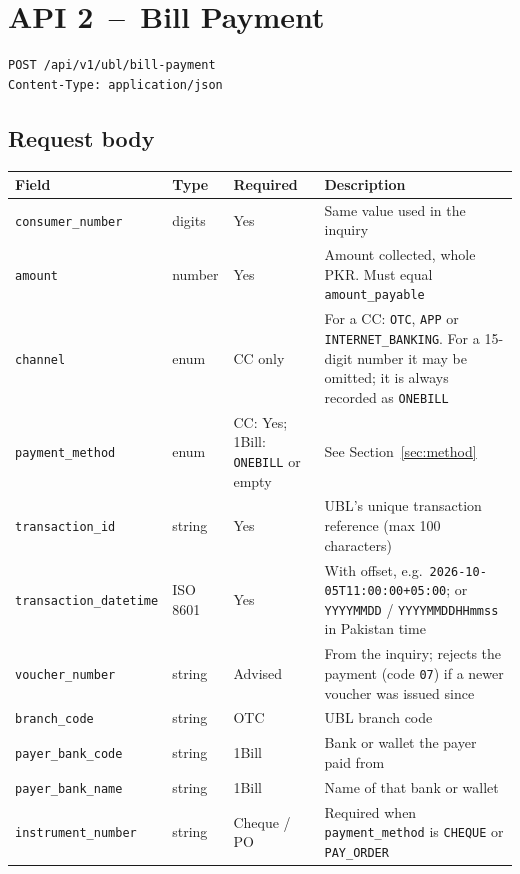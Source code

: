 \documentclass[11pt]{article}
\begin{document}
\section{API 2 \,--\, Bill Payment}\label{sec:payment}

\begin{lstlisting}
POST /api/v1/ubl/bill-payment
Content-Type: application/json
\end{lstlisting}

\subsection{Request body}
\begin{longtable}{@{}p{} p{} >{\raggedright\arraybackslash}p{} >{\raggedright\arraybackslash}p{}@{}}
\toprule
\textbf{Field} & \textbf{Type} & \textbf{Required} & \textbf{Description} \\
\midrule
\endhead
\texttt{consumer\_number} & digits & Yes & Same value used in the inquiry \\
\texttt{amount} & number & Yes & Amount collected, whole PKR. Must equal \texttt{amount\_payable} \\
\texttt{channel} & enum & CC only & For a CC: \texttt{OTC}, \texttt{APP} or \texttt{INTERNET\_BANKING}. For a 15-digit number it may be omitted; it is always recorded as \texttt{ONEBILL} \\
\texttt{payment\_method} & enum & CC: Yes; 1Bill: \texttt{ONEBILL} or empty & See Section~\ref{sec:method} \\
\texttt{transaction\_id} & string & Yes & UBL's unique transaction reference (max 100 characters) \\
\texttt{transaction\_datetime} & ISO 8601 & Yes & With offset, e.g.\ \texttt{2026-10-05T11:00:00+05:00}; or \texttt{YYYYMMDD} / \texttt{YYYYMMDDHHmmss} in Pakistan time \\
\texttt{voucher\_number} & string & Advised & From the inquiry; rejects the payment (code \texttt{07}) if a newer voucher was issued since \\
\texttt{branch\_code} & string & OTC & UBL branch code \\
\texttt{payer\_bank\_code} & string & 1Bill & Bank or wallet the payer paid from \\
\texttt{payer\_bank\_name} & string & 1Bill & Name of that bank or wallet \\
\texttt{instrument\_number} & string & Cheque / PO & Required when \texttt{payment\_method} is \texttt{CHEQUE} or \texttt{PAY\_ORDER} \\
\bottomrule
\end{longtable}
\end{document}

